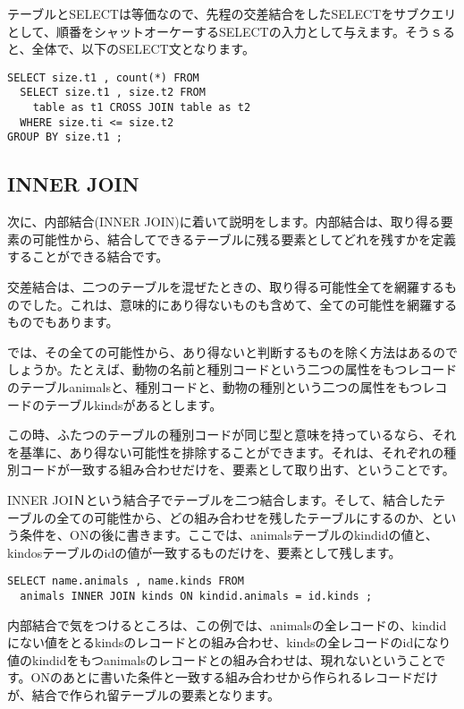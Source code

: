 テーブルとSELECTは等価なので、先程の交差結合をしたSELECTをサブクエリとして、順番をシャットオーケーするSELECTの入力として与えます。そうｓると、全体で、以下のSELECT文となります。

\begin{verbatim}
SELECT size.t1 , count(*) FROM
  SELECT size.t1 , size.t2 FROM
    table as t1 CROSS JOIN table as t2
  WHERE size.ti <= size.t2
GROUP BY size.t1 ;
\end{verbatim}

\subsection{INNER JOIN}

次に、内部結合(INNER JOIN)に着いて説明をします。内部結合は、取り得る要素の可能性から、結合してできるテーブルに残る要素としてどれを残すかを定義することができる結合です。

交差結合は、二つのテーブルを混ぜたときの、取り得る可能性全てを網羅するものでした。これは、意味的にあり得ないものも含めて、全ての可能性を網羅するものでもあります。

では、その全ての可能性から、あり得ないと判断するものを除く方法はあるのでしょうか。たとえば、動物の名前と種別コードという二つの属性をもつレコードのテーブルanimalsと、種別コードと、動物の種別という二つの属性をもつレコードのテーブルkindsがあるとします。

この時、ふたつのテーブルの種別コードが同じ型と意味を持っているなら、それを基準に、あり得ない可能性を排除することができます。それは、それぞれの種別コードが一致する組み合わせだけを、要素として取り出す、ということです。

INNER JOIＮという結合子でテーブルを二つ結合します。そして、結合したテーブルの全ての可能性から、どの組み合わせを残したテーブルにするのか、という条件を、ONの後に書きます。ここでは、animalsテーブルのkindidの値と、kindosテーブルのidの値が一致するものだけを、要素として残します。

\begin{verbatim}
SELECT name.animals , name.kinds FROM
  animals INNER JOIN kinds ON kindid.animals = id.kinds ; 
\end{verbatim}

内部結合で気をつけるところは、この例では、animalsの全レコードの、kindidにない値をとるkindsのレコードとの組み合わせ、kindsの全レコードのidになり値のkindidをもつanimalsのレコードとの組み合わせは、現れないということです。ONのあとに書いた条件と一致する組み合わせから作られるレコードだけが、結合で作られ留テーブルの要素となります。

